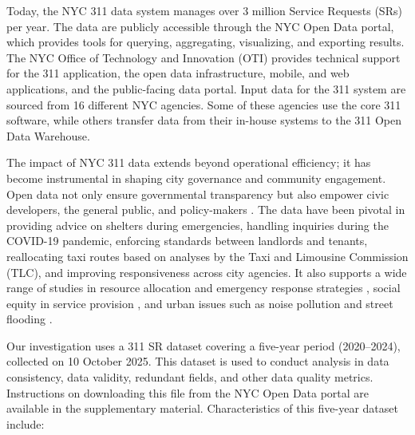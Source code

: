\documentclass[linenumber]{jdsart}
\begin{document}
Today, the NYC 311 data system manages over 3 million Service
Requests (SRs) per year. The data are publicly accessible 
through the NYC Open Data portal, which provides 
tools for querying, aggregating,
visualizing, and exporting results. The NYC Office of Technology 
and Innovation (OTI) provides technical support for the 311 application, 
the open data infrastructure, mobile, and web applications, 
and the public-facing data portal. Input data for the 311 system 
are sourced from 16 different NYC agencies. Some of these agencies
use the core 311 software, while others transfer data from their 
in-house systems to the 311 Open Data 
Warehouse.


The impact of NYC 311 data extends beyond operational efficiency; it
has become instrumental in shaping city governance and community
engagement. Open data not only ensure governmental transparency
but also empower civic developers, the general public, and
policy-makers \citep{minkoff2016nyc, o2017uncharted,
  kontokosta2021bias}.
The data have been pivotal in providing advice on shelters
during emergencies, handling inquiries during the COVID-19 
pandemic, enforcing standards between landlords 
and tenants, reallocating taxi
routes based on analyses by the Taxi and Limousine Commission (TLC),
and improving responsiveness across city agencies.
It also supports a wide range of studies in resource allocation and
emergency response strategies \citep{zha2014profiling, raj2021swift},
social equity in service provision \citep{white2018promises,
kontokosta2021bias}, and urban issues such as noise pollution
\citep{dove2022sounds} and street flooding
\citep{agonafir2022understanding}.


Our investigation uses a 311 SR dataset covering a five-year period (2020--2024), 
collected on 10 October 2025. This dataset is used 
to conduct analysis in data consistency, data validity, 
redundant fields, and other data quality metrics. Instructions 
on downloading this file from the NYC Open Data portal 
are available in the supplementary material. 
Characteristics of this five-year dataset include:
\end{document}
